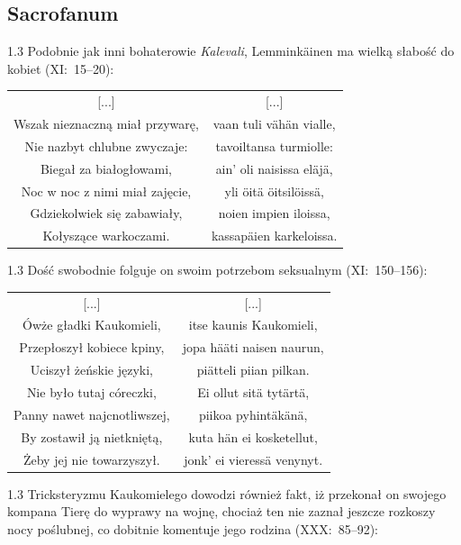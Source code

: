 \documentclass[11pt,a4paper,twoside]{report}
\begin{document}
\subsection*{Sacrofanum}
\begin{spacing}{1.3}
Podobnie jak inni bohaterowie \emph{Kalevali}, Lemminkäinen ma wielką słabość do kobiet (XI:~15--20):
\end{spacing}
{\centering
\small
\begin{longtable}{c c}
{[...]} & {[...]} \\
Wszak nieznaczną miał przywarę, & vaan tuli vähän vialle, \\
Nie nazbyt chlubne zwyczaje: & tavoiltansa turmiolle: \\
Biegał za białogłowami, & ain' oli naisissa eläjä, \\
Noc w noc z nimi miał zajęcie, & yli öitä öitsilöissä, \\
Gdziekolwiek się zabawiały, & noien impien iloissa, \\
Kołyszące warkoczami. & kassapäien karkeloissa. \\
\end{longtable}
}
\begin{spacing}{1.3}
Dość swobodnie folguje on swoim potrzebom seksualnym (XI:~150--156):
\end{spacing}
{\centering
\small
\begin{longtable}{c c}
{[...]} & {[...]}\\
Ówże gładki Kaukomieli, & itse kaunis Kaukomieli, \\
Przepłoszył kobiece kpiny, & jopa hääti naisen naurun, \\
Uciszył żeńskie języki, & piätteli piian pilkan. \\
Nie było tutaj córeczki, & Ei ollut sitä tytärtä, \\
Panny nawet najcnotliwszej, & piikoa pyhintäkänä, \\
By zostawił ją nietkniętą, & kuta hän ei kosketellut, \\
Żeby jej nie towarzyszył. & jonk' ei vieressä venynyt. \\
\end{longtable}
}
\begin{spacing}{1.3}
Tricksteryzmu Kaukomielego dowodzi również fakt, iż przekonał on swojego kompana Tierę do wyprawy na wojnę, chociaż ten nie zaznał jeszcze rozkoszy nocy poślubnej, co dobitnie komentuje jego rodzina  (XXX:~85--92):
\end{spacing}
\end{document}
